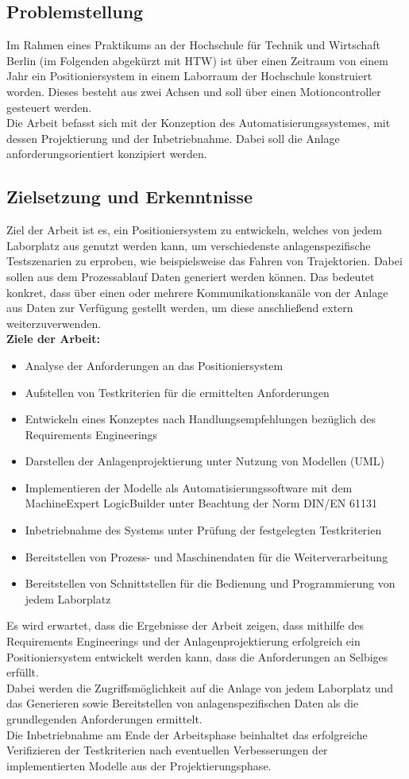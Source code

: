 \documentclass[../../Bachelorarbeit.tex]{subfiles}
\begin{document}
\subsection{Problemstellung}
Im Rahmen eines Praktikums an der Hochschule für Technik und Wirtschaft Berlin (im Folgenden abgekürzt mit HTW) ist über einen Zeitraum von einem Jahr ein Positioniersystem in einem Laborraum der Hochschule konstruiert worden. Dieses besteht aus zwei Achsen und soll über einen Motioncontroller gesteuert werden.\\
Die Arbeit befasst sich mit der Konzeption des Automatisierungssystemes, mit dessen Projektierung und der Inbetriebnahme. Dabei soll die Anlage anforderungsorientiert konzipiert werden.

\subsection{Zielsetzung und Erkenntnisse}
Ziel der Arbeit ist es, ein Positioniersystem zu entwickeln, welches von jedem Laborplatz aus genutzt werden kann, um verschiedenste anlagenspezifische Testszenarien zu erproben, wie beispielsweise das Fahren von Trajektorien. Dabei sollen aus dem Prozessablauf Daten generiert werden können. Das bedeutet konkret, dass über einen oder mehrere Kommunikationskanäle von der Anlage aus Daten zur Verfügung gestellt werden, um diese anschließend extern weiterzuverwenden.\\
\textbf{Ziele der Arbeit:}
\begin{itemize}
	\item Analyse der Anforderungen an das Positioniersystem
	\item Aufstellen von Testkriterien für die ermittelten Anforderungen
	\item Entwickeln eines Konzeptes nach Handlungsempfehlungen bezüglich des Requirements Engineerings
	\item Darstellen der Anlagenprojektierung unter Nutzung von Modellen (UML)
	\item Implementieren der Modelle als Automatisierungssoftware mit dem \glqq MachineExpert LogicBuilder\grqq{} unter Beachtung der Norm DIN/EN 61131
	\item Inbetriebnahme des Systems unter Prüfung der festgelegten Testkriterien
	\item Bereitstellen von Prozess- und Maschinendaten für die Weiterverarbeitung
	\item Bereitstellen von Schnittstellen für die Bedienung und Programmierung von jedem Laborplatz
\end{itemize}
Es wird erwartet, dass die Ergebnisse der Arbeit zeigen, dass mithilfe des Requirements Engineerings und der Anlagenprojektierung erfolgreich ein Positioniersystem entwickelt werden kann, dass die Anforderungen an Selbiges erfüllt.\\
Dabei werden die Zugriffsmöglichkeit auf die Anlage von jedem Laborplatz und das Generieren sowie Bereitstellen von anlagenspezifischen Daten als die grundlegenden Anforderungen ermittelt.\\
Die Inbetriebnahme am Ende der Arbeitsphase beinhaltet das erfolgreiche Verifizieren der Testkriterien nach eventuellen Verbesserungen der implementierten Modelle aus der Projektierungsphase.
\end{document}
